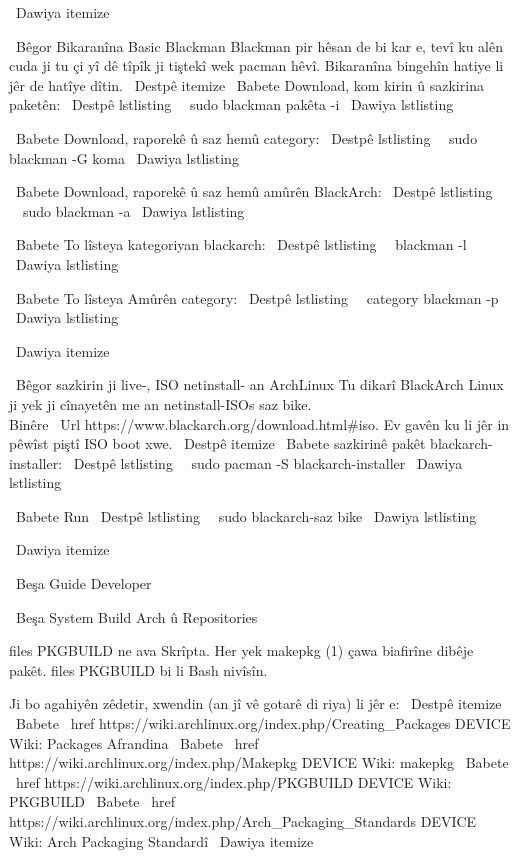 \ Dawiya {itemize}

\ Bêgor {Bikaranîna Basic Blackman} Blackman pir hêsan de bi kar e, tevî ku alên cuda ji tu çi yî
dê tîpîk ji tiştekî wek pacman hêvî. Bikaranîna bingehîn hatiye li jêr de hatîye dîtin.
\ Destpê {itemize}
\ Babete Download, kom kirin û sazkirina paketên:
\ Destpê {lstlisting}
  sudo blackman pakêta -i
\ Dawiya {lstlisting}

\ Babete Download, raporekê û saz hemû category:
\ Destpê {lstlisting}
  sudo blackman -G koma
\ Dawiya {lstlisting}

\ Babete Download, raporekê û saz hemû amûrên BlackArch:
\ Destpê {lstlisting}
  sudo blackman -a
\ Dawiya {lstlisting}

\ Babete To lîsteya kategoriyan blackarch:
\ Destpê {lstlisting}
  blackman -l
\ Dawiya {lstlisting}

\ Babete To lîsteya Amûrên category:
\ Destpê {lstlisting}
  category blackman -p
\ Dawiya {lstlisting}

\ Dawiya {itemize}

\ Bêgor {sazkirin ji live-, ISO netinstall- an ArchLinux}
Tu dikarî BlackArch Linux ji yek ji cînayetên me an netinstall-ISOs saz bike. \\ Binêre
\ Url {https://www.blackarch.org/download.html#iso}. Ev gavên ku li jêr in
pêwîst piştî ISO boot xwe.
\ Destpê {itemize}
\ Babete sazkirinê pakêt blackarch-installer:
\ Destpê {lstlisting}
  sudo pacman -S blackarch-installer
\ Dawiya {lstlisting}

\ Babete Run
\ Destpê {lstlisting}
  sudo blackarch-saz bike
\ Dawiya {lstlisting}

\ Dawiya {itemize}


\ Beşa {Guide Developer}

\ Beşa {System Build Arch û Repositories}

files PKGBUILD ne ava Skrîpta. Her yek makepkg (1) çawa biafirîne dibêje
pakêt. files PKGBUILD bi li Bash nivîsîn.

Ji bo agahiyên zêdetir, xwendin (an jî vê gotarê di riya) li jêr e:
\ Destpê {itemize}
\ Babete \ href {https://wiki.archlinux.org/index.php/Creating_Packages} {DEVICE Wiki: Packages Afrandina}
\ Babete \ href {https://wiki.archlinux.org/index.php/Makepkg} {DEVICE Wiki: makepkg}
\ Babete \ href {https://wiki.archlinux.org/index.php/PKGBUILD} {DEVICE Wiki: PKGBUILD}
\ Babete \ href {https://wiki.archlinux.org/index.php/Arch_Packaging_Standards} {DEVICE Wiki: Arch Packaging Standardî}
\ Dawiya {itemize}

